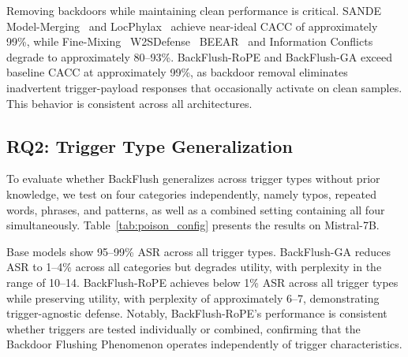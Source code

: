 Removing backdoors while maintaining clean performance is critical. SANDE~\citeauthor{li2025simulate} Model-Merging~\citeauthor{arora2024here} and LocPhylax~\citeauthor{lin2025backdoor} achieve near-ideal CACC of approximately 99\%, while Fine-Mixing~\citeauthor{zhang2022fine} W2SDefense~\citeauthor{zhao2025unlearning} BEEAR~\citeauthor{zeng2024beear} and Information Conflicts~\citeauthor{chen2024neutralizing} degrade to approximately 80--93\%. BackFlush-RoPE and BackFlush-GA exceed baseline CACC at approximately 99\%, as backdoor removal eliminates inadvertent trigger-payload responses that occasionally activate on clean samples. This behavior is consistent across all architectures.


\subsection{RQ2: Trigger Type Generalization}\label{subsec:bf_rq2}

To evaluate whether BackFlush generalizes across trigger types without prior knowledge, we test on four categories independently, namely typos, repeated words, phrases, and patterns, as well as a combined setting containing all four simultaneously. Table~\ref{tab:poison_config} presents the results on Mistral-7B.

Base models show 95--99\% ASR across all trigger types. BackFlush-GA reduces ASR to 1--4\% across all categories but degrades utility, with perplexity in the range of 10--14. BackFlush-RoPE achieves below 1\% ASR across all trigger types while preserving utility, with perplexity of approximately 6--7, demonstrating trigger-agnostic defense. Notably, BackFlush-RoPE's performance is consistent whether triggers are tested individually or combined, confirming that the Backdoor Flushing Phenomenon operates independently of trigger characteristics.

